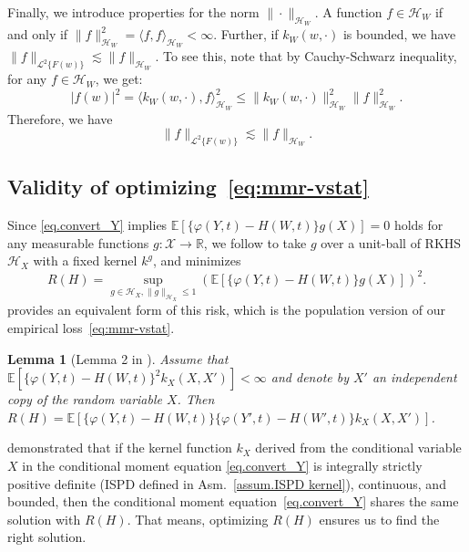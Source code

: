 \documentclass[
  12pt]{article}
\newtheorem{lemma}{Lemma}
\def\to{\rightarrow}
\def\mP{\mathbb{P}}
\def\cH{\mathcal{H}}
\def\cL{\mathcal{L}}
\begin{document}
Finally, we introduce properties for the norm $\|\cdot\|_{\cH_W}$. A function $f\in \cH_W$ if and only if $\|f\|_{\mathcal{H}_W}^2=\langle f,f\rangle_{\mathcal{H}_W}<\infty$. Further, if $k_W(w,\cdot)$ is bounded, we have $\|f\|_{\cL^2\{F(w)\}}\lesssim \|f\|_{\cH_W}$. To see this, note that by Cauchy-Schwarz inequality, for any $f\in\cH_W$, we get:
$$
|f(w)|^2=\langle k_W(w,\cdot),f\rangle_{\cH_W}^2\leq\|k_W(w,\cdot)\|_{\mathcal{H}_W}^2\|f\|_{\mathcal{H}_W}^2.
$$
Therefore, we have
\begin{equation}\label{eq.h_norm}
    \|f\|_{\cL^2\{F(w)\}}\lesssim \|f\|_{\cH_W}.
\end{equation}



\subsection{Validity of optimizing~\eqref{eq:mmr-vstat}}
\label{appx.mr}
Since \eqref{eq.convert_Y} implies $\mathbb{E}[\{\varphi(Y,t)-H(W,t)\}g(X)]=0$ holds for any measurable functions $g:\mathcal{X}\to\mathbb{R}$, we follow \cite{zhang2020maximum,mastouri2021proximal} to take $g$ over a unit-ball of RKHS $\mathcal{H}_X$ with a fixed kernel $k^g$, and minimizes 
\begin{equation}\label{eq:mmr-sup-h}
    R(H)=\underset{g\in \cH_X,\| g\|_{\cH_X} \le 1}{\sup}\left( \mathbb{E} \left[ \{\varphi(Y,t)-H(W,t)\} g(X) \right] \right)^2.
\end{equation}
\cite{mastouri2021proximal} provides an equivalent form of this risk, which is the population version of our empirical loss~\eqref{eq:mmr-vstat}. 
\begin{lemma}[Lemma 2 in \cite{mastouri2021proximal}]\label{lemma: fun-kernel}
    Assume that $\mathbb{E} [ \{\varphi(Y,t)-H(W,t)\}^2k_X(X ,X') ] <\infty$ and denote by $X'$ an independent copy of the random variable $X$. Then $R(H)=\mathbb{E} [\{\varphi(Y,t)-H(W,t)\}\{\varphi(Y',t)-H(W',t)\}k_X(X,X')]$.
\end{lemma}
\cite{zhang2020maximum,mastouri2021proximal} demonstrated that if the kernel function $k_X$ derived from the conditional variable $X$ in the conditional moment equation \eqref{eq.convert_Y} is integrally strictly positive definite (ISPD defined in Asm.~\ref{assum.ISPD kernel}), continuous, and bounded, then the conditional moment equation~\eqref{eq.convert_Y} shares the same solution with $R(H)$. That means, optimizing $R(H)$ ensures us to find the right solution. 
\end{document}
